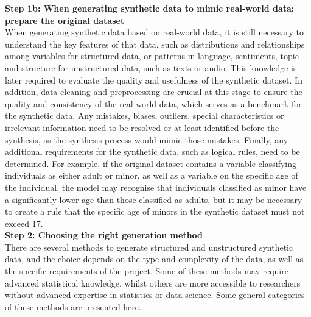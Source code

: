 \textbf{Step 1b: When generating synthetic data to mimic real-world data: prepare the original dataset} \\
When generating synthetic data based on real-world data, it is still necessary to understand the key features of that data, such as distributions and relationships among variables for structured data, or patterns in language, sentiments, topic and structure for unstructured data, such as texts or audio. This knowledge is later required to evaluate the quality and usefulness of the synthetic dataset. In addition, data cleaning and preprocessing are crucial at this stage to ensure the quality and consistency of the real-world data, which serves as a benchmark for the synthetic data. Any mistakes, biases, outliers, special characteristics or irrelevant information need to be resolved or at least identified before the synthesis, as the synthesis process would mimic those mistakes. Finally, any additional requirements for the synthetic data, such as logical rules, need to be determined. For example, if the original dataset contains a variable classifying individuals as either adult or minor, as well as a variable on the specific age of the individual, the model may recognise that individuals classified as minor have a significantly lower age than those classified as adults, but it may be necessary to create a rule that the specific age of minors in the synthetic dataset must not exceed 17. \\

\textbf{Step 2: Choosing the right generation method} \\
There are several methods to generate structured and unstructured synthetic data, and the choice depends on the type and complexity of the data, as well as the specific requirements of the project. Some of these methods may require advanced statistical knowledge, whilst others are more accessible to researchers without advanced expertise in statistics or data science. Some general categories of these methods are presented here.
 
